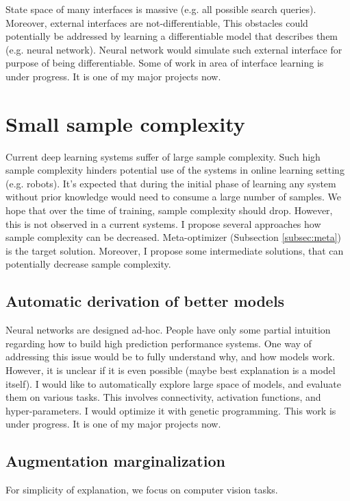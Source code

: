 \documentclass{article}
\begin{document}
State space of many interfaces is massive (e.g. all possible search queries).
Moreover, external interfaces are not-differentiable, 
This obstacles could potentially be addressed by learning a differentiable 
model that describes them (e.g. neural network). Neural network would simulate such 
external interface for purpose of being differentiable.
Some of work in area of interface learning is under progress. It is one of my major projects now.


\section{Small sample complexity}
Current deep learning systems suffer of large sample complexity. Such 
high sample complexity hinders potential use of the systems in online 
learning setting (e.g. robots). It’s expected that during the initial phase of 
learning any system without prior knowledge would need to consume a large number of samples. 
We hope that over the time of training, sample complexity should drop. However, this is 
not observed in a current systems. I propose several approaches how sample complexity can be decreased. 
Meta-optimizer (Subsection \ref{subsec:meta}) is the target solution. Moreover, I propose some intermediate solutions, that can potentially
decrease sample complexity.

\subsection{Automatic derivation of better models}
Neural networks are designed ad-hoc. People have only some partial intuition
regarding how to build high prediction performance systems. 
One way of addressing this issue would be to
fully understand why, and how models work. However, it is unclear if it is even 
possible (maybe best explanation is a model itself). I would like to automatically
explore large space of models, and evaluate them on various tasks. 
This involves connectivity, activation functions, and hyper-parameters.
I would optimize it with genetic programming.
This work is under progress. It is one of my major projects now.


\subsection{Augmentation marginalization}
For simplicity of explanation, we focus on computer vision tasks.
\end{document}
